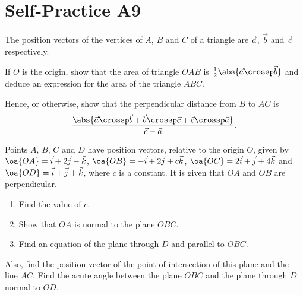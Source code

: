 \section{Self-Practice A9}

\begin{problem}
    The position vectors of the vertices of $A$, $B$ and $C$ of a triangle are $\vec a$, $\vec b$ and $\vec c$ respectively.

    If $O$ is the origin, show that the area of triangle $OAB$ is $\frac12 \abs{\vec a \crossp \vec b}$ and deduce an expression for the area of the triangle $ABC$.

    Hence, or otherwise, show that the perpendicular distance from $B$ to $AC$ is \[\frac{\abs{\vec a \crossp \vec b + \vec b \crossp \vec c + \vec c \crossp \vec a}}{\vec c - \vec a}.\]
\end{problem}

\begin{problem}
    Points $A$, $B$, $C$ and $D$ have position vectors, relative to the origin $O$, given by $\oa{OA} = \vec i + 2\vec j - \vec k$, $\oa{OB} = -\vec i + 2\vec j + c\vec k$, $\oa{OC} = 2\vec i + \vec j + 4 \vec k$ and $\oa{OD} = \vec i + \vec j + \vec k$, where $c$ is a constant. It is given that $OA$ and $OB$ are perpendicular.

    \begin{enumerate}
        \item Find the value of $c$.
        \item Show that $OA$ is normal to the plane $OBC$.
        \item Find an equation of the plane through $D$ and parallel to $OBC$.
    \end{enumerate}

    Also, find the position vector of the point of intersection of this plane and the line $AC$. Find the acute angle between the plane $OBC$ and the plane through $D$ normal to $OD$.
\end{problem}

